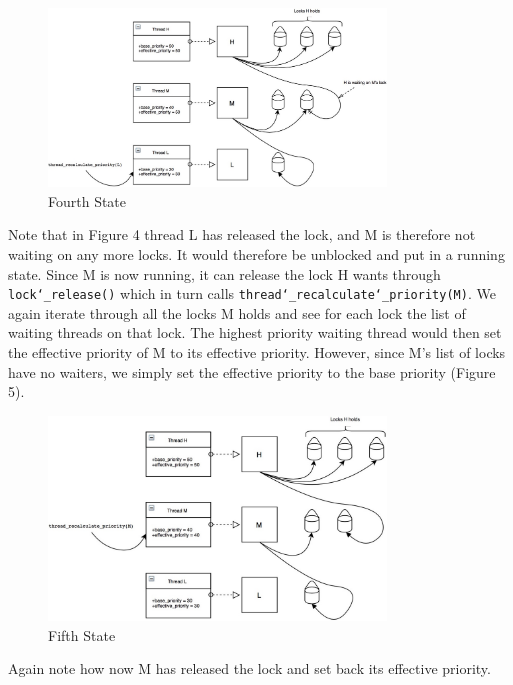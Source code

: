 \documentclass{article}
\renewcommand{\_}{\char`_}
\begin{document}
\begin{figure}[ht!]
\centering
\hspace{3em}
\includegraphics[width=0.8\textwidth]{Images/Task1/4Nested}
\caption{Fourth State}
\end{figure}

Note that in Figure 4 thread L has released the lock, and M is therefore not waiting on any more locks. It would therefore be unblocked and put in a running state. Since M is now running, it can release the lock H wants through \texttt{lock\_release()} which in turn calls \texttt{thread\_recalculate\_priority(M)}. We again iterate through all the locks M holds and see for each lock the list of waiting threads on that lock. The highest priority waiting thread would then set the effective priority of M to its effective priority. However, since M's list of locks have no waiters, we simply set the effective priority to the base priority (Figure 5). 

\begin{figure}[ht!]
\centering
\hspace{3em}
\includegraphics[width=0.8\textwidth]{Images/Task1/5Nested}
\caption{Fifth State}
\end{figure}

Again note how now M has released the lock and set back its effective priority.
\end{document}
